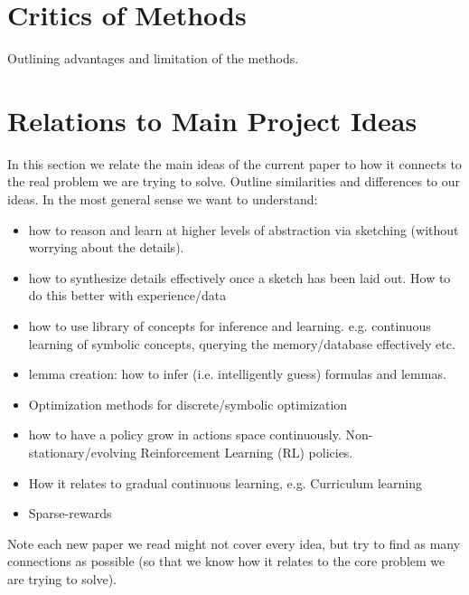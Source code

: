 \documentclass{article}
\begin{document}
\section{Critics of Methods}

Outlining advantages and limitation of the methods.

\section{Relations to Main Project Ideas}

In this section we relate the main ideas of the current paper to how it connects to the real problem we are trying to solve. 
Outline similarities and differences to our ideas.
In the most general sense we want to understand:

\begin{itemize}
    \item how to reason and learn at higher levels of abstraction via sketching (without worrying about the details).
    \item how to synthesize details effectively once a sketch has been laid out.
    How to do this better with experience/data
    \item how to use library of concepts for inference and learning. e.g.  continuous learning of symbolic concepts, querying the memory/database effectively etc.
    \item lemma creation: how to infer (i.e. intelligently guess) formulas and lemmas.
    \item Optimization methods for discrete/symbolic optimization
    \item how to have a policy grow in actions space continuously. Non-stationary/evolving Reinforcement Learning (RL) policies.
    \item How it relates to gradual continuous learning, e.g. Curriculum learning
    \item Sparse-rewards
\end{itemize}

Note each new paper we read might not cover every idea, but try to find as many connections as possible (so that we know how it relates to the core problem we are trying to solve).
\end{document}
